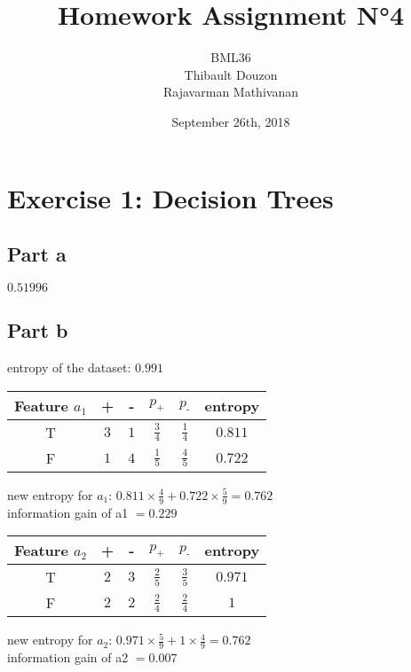 \documentclass[a4paper, 10pt]{article}
\title{Homework Assignment N°4}
\author{BML36\\Thibault Douzon\\Rajavarman Mathivanan}
\date{September 26th, 2018}
\begin{document}
\maketitle

\pagebreak

\tableofcontents

\pagebreak
\section{Exercise 1: Decision Trees}
\subsection{Part a}
$0.51996$
\subsection{Part b}
entropy of the dataset: $0.991$
\begin{center}
    \begin{tabular}{ |c|c|c|c|c|c| }
        \hline
        Feature $a_1$ & +      & -     & $p_\text{+}$ & $p_\text{-}$ & entropy\\
        \hline
        T          & $3$    & $1$   & $\frac{3}{4}$ & $\frac{1}{4}$ & $0.811$\\
        \hline
        F          & $1$    & $4$   & $\frac{1}{5}$ & $\frac{4}{5}$ & $0.722$\\
        \hline
    \end{tabular}
\end{center}
new entropy for $a_1$: $0.811\times\frac{4}{9} + 0.722\times\frac{5}{9} = 0.762$
\\
information gain of a1 $= 0.229$

\begin{center}
    \begin{tabular}{ |c|c|c|c|c|c| }
        \hline
        Feature $a_2$ & +      & -     & $p_\text{+}$ & $p_\text{-}$ & entropy\\
        \hline
        T          & $2$    & $3$   & $\frac{2}{5}$ & $\frac{3}{5}$ & $0.971$\\
        \hline
        F          & $2$    & $2$   & $\frac{2}{4}$ & $\frac{2}{4}$ & $1$\\
        \hline
    \end{tabular}
\end{center}
new entropy for $a_2$: $0.971\times\frac{5}{9} + 1\times\frac{4}{9} = 0.762$
\\
information gain of a2 $= 0.007$
\end{document}
